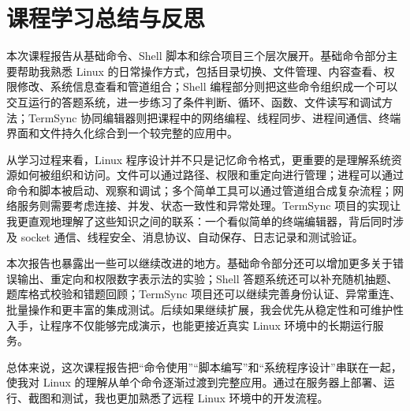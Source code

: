 \section{课程学习总结与反思}

本次课程报告从基础命令、Shell 脚本和综合项目三个层次展开。基础命令部分主要帮助我熟悉 Linux 的日常操作方式，包括目录切换、文件管理、内容查看、权限修改、系统信息查看和管道组合；Shell 编程部分则把这些命令组织成一个可以交互运行的答题系统，进一步练习了条件判断、循环、函数、文件读写和调试方法；TermSync 协同编辑器则把课程中的网络编程、线程同步、进程间通信、终端界面和文件持久化综合到一个较完整的应用中。

从学习过程来看，Linux 程序设计并不只是记忆命令格式，更重要的是理解系统资源如何被组织和访问。文件可以通过路径、权限和重定向进行管理；进程可以通过命令和脚本被启动、观察和调试；多个简单工具可以通过管道组合成复杂流程；网络服务则需要考虑连接、并发、状态一致性和异常处理。TermSync 项目的实现让我更直观地理解了这些知识之间的联系：一个看似简单的终端编辑器，背后同时涉及 socket 通信、线程安全、消息协议、自动保存、日志记录和测试验证。

本次报告也暴露出一些可以继续改进的地方。基础命令部分还可以增加更多关于错误输出、重定向和权限数字表示法的实验；Shell 答题系统还可以补充随机抽题、题库格式校验和错题回顾；TermSync 项目还可以继续完善身份认证、异常重连、批量操作和更丰富的集成测试。后续如果继续扩展，我会优先从稳定性和可维护性入手，让程序不仅能够完成演示，也能更接近真实 Linux 环境中的长期运行服务。

总体来说，这次课程报告把“命令使用”“脚本编写”和“系统程序设计”串联在一起，使我对 Linux 的理解从单个命令逐渐过渡到完整应用。通过在服务器上部署、运行、截图和测试，我也更加熟悉了远程 Linux 环境中的开发流程。
